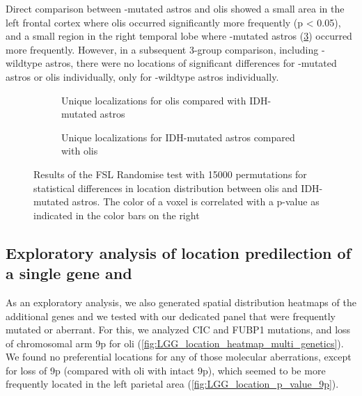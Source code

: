 Direct comparison between -mutated \glspl{astro} and \glspl{oli} showed a small area in the left frontal cortex where \glspl{oli} occurred significantly more frequently (p \num{< 0.05}), and a small region in the right temporal lobe where -mutated \glspl{astro} (\cref{fig:LGG_location_oligo_astro_p_value}) occurred more frequently.
However, in a subsequent 3-group comparison, including -wildtype \glspl{astro}, there were no locations of significant differences for -mutated \glspl{astro} or \glspl{oli} individually, only for -wildtype \glspl{astro} individually.

\begin{figure}[htbp]
    \centering
    \begin{subfigure}[b]{\textwidth}
        \caption{Unique localizations for \glspl{oli} compared with \acrshort{IDH}-mutated \glspl{astro}}\label{fig:LGG_location_p_values_1p19q_codeleted_vs_intact_codeleted}
    \end{subfigure}
    \begin{subfigure}[b]{\textwidth}
        \caption{Unique localizations for \acrshort{IDH}-mutated \glspl{astro} compared with \glspl{oli}}\label{fig:LGG_location_p_values_1p19q_codeleted_vs_intact_intact}
    \end{subfigure}
    \caption{Results of the \acrshort{FSL} Randomise test with \num{15000} permutations for statistical differences in location distribution between \glspl{oli} and \acrshort{IDH}-mutated \glspl{astro}.
    The color of a voxel is correlated with a p-value as indicated in the color bars on the right}\label{fig:LGG_location_oligo_astro_p_value}
\end{figure}

\subsection{Exploratory analysis of location predilection of a single gene and }

As an exploratory analysis, we also generated spatial distribution heatmaps of the additional genes and  we tested with our dedicated  panel that were frequently mutated or aberrant.
For this, we analyzed CIC and FUBP1 mutations, and loss of chromosomal arm 9p for \gls{oli} (\cref{fig:LGG_location_heatmap_multi_genetics}).
We found no preferential locations for any of those molecular aberrations, except for loss of 9p (compared with \gls{oli} with intact 9p), which seemed to be more frequently located in the left parietal area (\cref{fig:LGG_location_p_value_9p}).

